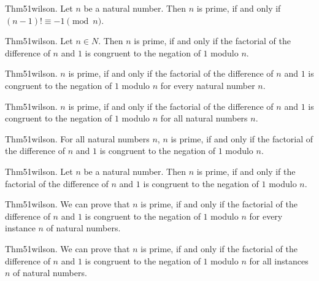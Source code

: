 \documentclass{article}
\begin{document}
Thm51wilson. Let $n$ be a natural number. Then $n$ is prime, if and only if $(n - 1)! \equiv - 1 \pmod{ n}$.

Thm51wilson. Let $n \in N$. Then $n$ is prime, if and only if the factorial of the difference of $n$ and $1$ is congruent to the negation of $1$ modulo $n$.

Thm51wilson. $n$ is prime, if and only if the factorial of the difference of $n$ and $1$ is congruent to the negation of $1$ modulo $n$ for every natural number $n$.

Thm51wilson. $n$ is prime, if and only if the factorial of the difference of $n$ and $1$ is congruent to the negation of $1$ modulo $n$ for all natural numbers $n$.

Thm51wilson. For all natural numbers $n$, $n$ is prime, if and only if the factorial of the difference of $n$ and $1$ is congruent to the negation of $1$ modulo $n$.

Thm51wilson. Let $n$ be a natural number. Then $n$ is prime, if and only if the factorial of the difference of $n$ and $1$ is congruent to the negation of $1$ modulo $n$.

Thm51wilson. We can prove that $n$ is prime, if and only if the factorial of the difference of $n$ and $1$ is congruent to the negation of $1$ modulo $n$ for every instance $n$ of natural numbers.

Thm51wilson. We can prove that $n$ is prime, if and only if the factorial of the difference of $n$ and $1$ is congruent to the negation of $1$ modulo $n$ for all instances $n$ of natural numbers.
\end{document}
